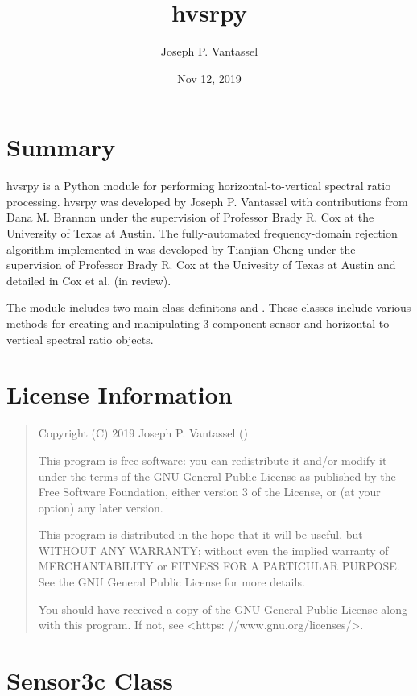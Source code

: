 \documentclass[letterpaper,10pt,english,openany,oneside]{sphinxmanual}
\title{hvsrpy}
\date{Nov 12, 2019}
\author{Joseph P.\@{} Vantassel}
\begin{document}
\pagestyle{empty}
\sphinxmaketitle
\pagestyle{plain}
\sphinxtableofcontents
\pagestyle{normal}
\label{\detokenize{index::doc}}



\chapter{Summary}
\label{\detokenize{index:summary}}
hvsrpy is a Python module for performing horizontal-to-vertical spectral ratio
processing. hvsrpy was developed by Joseph P. Vantassel with contributions
from Dana M. Brannon under the supervision of Professor Brady R. Cox at the
University of Texas at Austin. The fully-automated frequency-domain rejection
algorithm implemented in  was developed by Tianjian Cheng under the
supervision of Professor Brady R. Cox at the Univesity of Texas at Austin and
detailed in Cox et al. (in review).

The module includes two main class definitons  and . These
classes include various methods for creating and manipulating 3-component
sensor and horizontal-to-vertical spectral ratio objects.


\chapter{License Information}
\label{\detokenize{index:license-information}}\begin{quote}

Copyright (C) 2019 Joseph P. Vantassel ()

This program is free software: you can redistribute it and/or modify
it under the terms of the GNU General Public License as published by
the Free Software Foundation, either version 3 of the License, or
(at your option) any later version.

This program is distributed in the hope that it will be useful,
but WITHOUT ANY WARRANTY; without even the implied warranty of
MERCHANTABILITY or FITNESS FOR A PARTICULAR PURPOSE.  See the
GNU General Public License for more details.

You should have received a copy of the GNU General Public License
along with this program.  If not, see \textless{}https: //www.gnu.org/licenses/\textgreater{}.
\end{quote}


\chapter{Sensor3c Class}
\label{\detokenize{index:sensor3c-class}}
\end{document}
